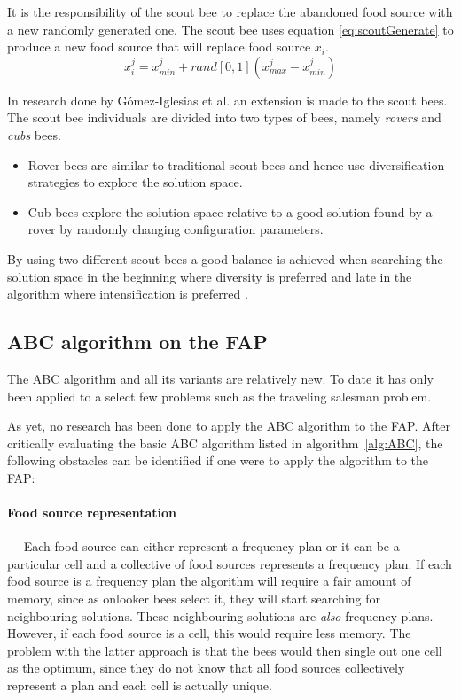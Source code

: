 It is the responsibility of the scout bee to replace the abandoned food source with a new randomly generated one\cite{BeeJobShop,ABCCompareStudy,ABCImageEnhancement}. The scout bee uses equation \ref{eq:scoutGenerate} to produce a new food source that will replace food source $x_i$.
\begin{equation}
\label{eq:scoutGenerate}
x^j_i = x^j_{min} + rand[0,1](x^j_{max} - x^j_{min})
\end{equation}

In research done by G\'{o}mez-Iglesias et al. \cite{ABCFusionGrid} an extension is made to the scout bees. The scout bee individuals are divided into two types of bees, namely \emph{rovers} and \emph{cubs} bees\cite{ABCFusionGrid}.
\begin{itemize}
\item{Rover bees} are similar to traditional scout bees and hence use diversification strategies to explore the solution space. 
\item {Cub bees} explore the solution space relative to a good solution found by a rover by randomly changing configuration parameters. 
\end{itemize}
By using two different scout bees a good balance is achieved when searching the solution space in the beginning where diversity is preferred and late in the algorithm where intensification is preferred \cite{ABCFusionGrid}.
\subsection{ABC algorithm on the FAP}
The ABC algorithm and all its variants are relatively new. To date it has only been applied to a select few problems such as the traveling salesman problem.

As yet, no research has been done to apply the ABC algorithm to the FAP. After critically evaluating the basic ABC algorithm listed in algorithm~\ref{alg:ABC}, the following obstacles can be identified if one were to apply the algorithm to the FAP:
\paragraph{Food source representation}
--- Each food source can either represent a frequency plan or it can be a particular cell and a collective of food sources represents a frequency plan. If each food source is a frequency plan the algorithm will require a fair amount of memory, since as onlooker bees select it, they will start searching for neighbouring solutions. These neighbouring solutions are \emph{also} frequency plans. However, if each food source is a cell, this would require less memory. The problem with the latter approach is that the bees would then single out one cell as the optimum, since they do not know that all food sources collectively represent a plan and each cell is actually unique.
